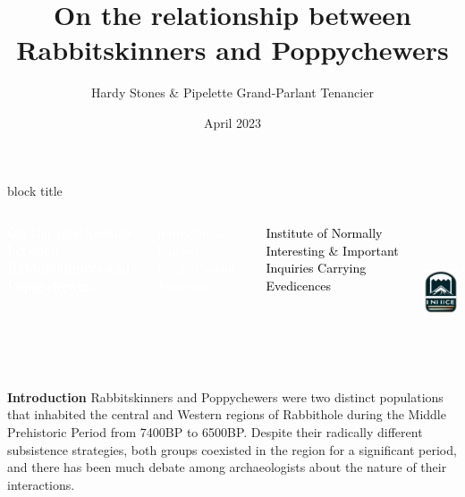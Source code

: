 \documentclass[final]{beamer}
\title{On the relationship between Rabbitskinners and Poppychewers}
\author{Hardy Stones \& Pipelette Grand-Parlant Tenancier}
\institute{Human Language Technology and Pattern Recognition,RWTH Aachen University}
\date{April 2023}
\begin{document}
\begin{frame}[t]
    \vspace{-.5cm}
    \begin{beamercolorbox}[wd=\paperwidth]{block title}
    \vspace{.8cm}
        \begin{columns}


            {
                \raggedleft
                \textcolor{white}{\textbf{On the relationship between Rabbitskinners and Poppychewers}}\par
                \textcolor{white}{Hardy Stone \& Pipelette Grand-Parlant Tenancier}\par
                \textcolor{black}{Institute of Normally Interesting \& Important Inquiries Carrying Evedicences}\par
            }

            \includegraphics[height=4cm]{uni2.png}
        \end{columns}
    \vspace{.8cm}

    \end{beamercolorbox}


    \vspace{2cm}


    \begin{columns}[t]

        \begin{block}{\textbf{Introduction}}
            Rabbitskinners and Poppychewers were two distinct populations that inhabited the central and Western regions of Rabbithole during the Middle Prehistoric Period from 7400BP to 6500BP. Despite their radically different subsistence strategies, both groups coexisted in the region for a significant period, and there has been much debate among archaeologists about the nature of their interactions.
        \end{block}
        \vspace{3cm}


\end{columns}
\end{frame}
\end{document}
